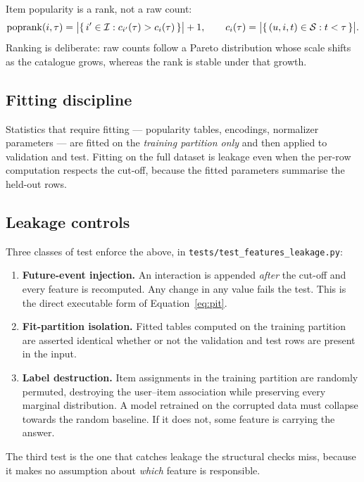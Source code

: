 Item popularity is a rank, not a raw count:
\begin{equation}
  \mathrm{poprank}(i, \tau) = \big|\{\, i' \in \mathcal{I} : c_{i'}(\tau) > c_{i}(\tau) \,\}\big| + 1 ,
  \qquad
  c_i(\tau) = \big|\{\,(u,i,t) \in \mathcal{S} : t < \tau\,\}\big| .
\end{equation}
Ranking is deliberate: raw counts follow a Pareto distribution whose scale
shifts as the catalogue grows, whereas the rank is stable under that growth.

\subsection{Fitting discipline}

Statistics that require fitting --- popularity tables, encodings, normalizer
parameters --- are fitted on the \emph{training partition only} and then
applied to validation and test. Fitting on the full dataset is leakage even
when the per-row computation respects the cut-off, because the fitted
parameters summarise the held-out rows.

\subsection{Leakage controls}

Three classes of test enforce the above, in
\texttt{tests/test\_features\_leakage.py}:

\begin{enumerate}
  \item \textbf{Future-event injection.} An interaction is appended
        \emph{after} the cut-off and every feature is recomputed. Any change
        in any value fails the test. This is the direct executable form of
        Equation~\ref{eq:pit}.
  \item \textbf{Fit-partition isolation.} Fitted tables computed on the
        training partition are asserted identical whether or not the
        validation and test rows are present in the input.
  \item \textbf{Label destruction.} Item assignments in the training
        partition are randomly permuted, destroying the user--item
        association while preserving every marginal distribution. A model
        retrained on the corrupted data must collapse towards the random
        baseline. If it does not, some feature is carrying the answer.
\end{enumerate}

The third test is the one that catches leakage the structural checks miss,
because it makes no assumption about \emph{which} feature is responsible.

